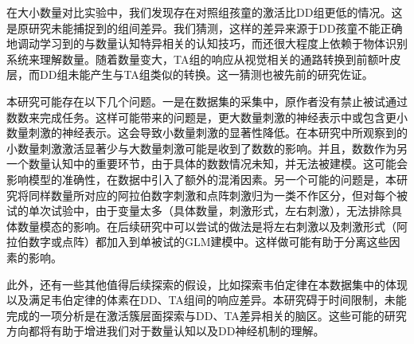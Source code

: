 \documentclass[bachelor, comfort]{shtthesis}
\begin{document}
在大小数量对比实验中，我们发现存在对照组孩童的激活比DD组更低的情况。这是原研究未能捕捉到的组间差异。我们猜测，这样的差异来源于DD孩童不能正确地调动学习到的与数量认知特异相关的认知技巧，而还很大程度上依赖于物体识别系统来理解数量。随着数量变大，TA组的响应从视觉相关的通路转换到前额叶皮层，而DD组未能产生与TA组类似的转换。这一猜测也被先前的研究佐证\cite{num19}。

本研究可能存在以下几个问题。一是在数据集的采集中，原作者没有禁止被试通过数数来完成任务。这样可能带来的问题是，更大数量刺激的神经表示中或包含更小数量刺激的神经表示。这会导致小数量刺激的显著性降低。在本研究中所观察到的小数量刺激激活显著少与大数量刺激可能是收到了数数的影响。并且，数数作为另一个数量认知中的重要环节，由于具体的数数情况未知，并无法被建模。这可能会影响模型的准确性，在数据中引入了额外的混淆因素。另一个可能的问题是，本研究将同样数量所对应的阿拉伯数字刺激和点阵刺激归为一类不作区分，但对每个被试的单次试验中，由于变量太多（具体数量，刺激形式，左右刺激），无法排除具体数量模态的影响。在后续研究中可以尝试的做法是将左右刺激以及刺激形式（阿拉伯数字或点阵）都加入到单被试的GLM建模中。这样做可能有助于分离这些因素的影响。

此外，还有一些其他值得后续探索的假设，比如探索韦伯定律在本数据集中的体现以及满足韦伯定律的体素在DD、TA组间的响应差异。本研究碍于时间限制，未能完成的一项分析是在激活簇层面探索与DD、TA差异相关的脑区。这些可能的研究方向都将有助于增进我们对于数量认知以及DD神经机制的理解。



\makebiblio
\end{document}
